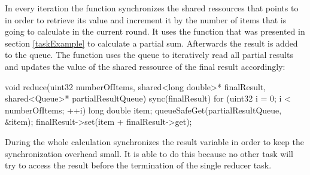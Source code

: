 In every iteration the function synchronizes the shared ressources that  points to in order to retrieve its value and increment it by the number of items that  is going to calculate in the current round. It uses the  function that was presented in section \ref{taskExample} to calculate a partial sum. Afterwards the result is added to the queue. 
The  function uses the queue to iteratively read all partial results and updates the value of the shared ressource of the final result accordingly:
\begin{ccode}
void reduce(uint32 numberOfItems, shared<long double>* finalResult, shared<Queue>* partialResultQueue) {
  sync(finalResult) { 
    for (uint32 i = 0; i < numberOfItems; ++i) { 
      long double item; 
      queueSafeGet(partialResultQueue, &item); 
      finalResult->set(item + finalResult->get); 
    }
  }
}
\end{ccode}
During the whole calculation  synchronizes the result variable in order to keep the synchronization overhead small. It is able to do this because no other task will try to access the result before the termination of the single reducer task.

